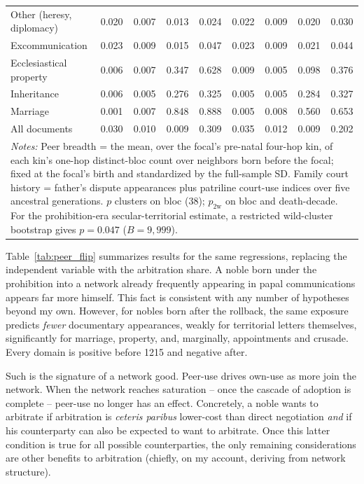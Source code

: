 \documentclass[12pt]{article}
\theoremstyle{definition}
\theoremstyle{remark}
\begin{document}
\begin{table}[!t]
{\begin{tabular}{lcccccccc}
Other (heresy, diplomacy) & 0.020 & 0.007 & 0.013 & 0.024 & 0.022 & 0.009 & 0.020 & 0.030 \\
Excommunication & 0.023 & 0.009 & 0.015 & 0.047 & 0.023 & 0.009 & 0.021 & 0.044 \\
Ecclesiastical property & 0.006 & 0.007 & 0.347 & 0.628 & 0.009 & 0.005 & 0.098 & 0.376 \\
Inheritance & 0.006 & 0.005 & 0.276 & 0.325 & 0.005 & 0.005 & 0.284 & 0.327 \\
Marriage & 0.001 & 0.007 & 0.848 & 0.888 & 0.005 & 0.008 & 0.560 & 0.653 \\
All documents & 0.030 & 0.010 & 0.009 & 0.309 & 0.035 & 0.012 & 0.009 & 0.202 \\
\midrule
\multicolumn{9}{p{0.96\textwidth}}{\footnotesize \textit{Notes:} Peer breadth = the mean, over the focal's pre-natal four-hop kin, of each kin's one-hop distinct-bloc count over neighbors born before the focal; fixed at the focal's birth and standardized by the full-sample SD. Family court history = father's dispute appearances plus patriline court-use indices over five ancestral generations. $p$ clusters on bloc (38); $p_{\text{2w}}$ on bloc and death-decade. For the prohibition-era secular-territorial estimate, a restricted wild-cluster bootstrap gives $p=0.047$ ($B=9{,}999$).} \\
\bottomrule
\end{tabular}
}
\end{table}



Table~\ref{tab:peer_flip} summarizes results for the same regressions, replacing the independent variable with the arbitration share. A noble born under the prohibition into a network already frequently appearing in papal communications appears far more himself. This fact is consistent with any number of hypotheses beyond my own. However, for nobles born after the rollback, the same exposure predicts \emph{fewer} documentary appearances, weakly for territorial letters themselves, significantly for marriage, property, and, marginally, appointments and crusade. Every domain is positive before 1215 and negative after.

Such is the signature of a network good. Peer-use drives own-use as more join the network. When the network reaches saturation -- once the cascade of adoption is complete -- peer-use no longer has an effect. Concretely, a noble wants to arbitrate if arbitration is \textit{ceteris paribus} lower-cost than direct negotiation \textit{and} if his counterparty can also be expected to want to arbitrate. Once this latter condition is true for all possible counterparties, the only remaining considerations are other benefits to arbitration (chiefly, on my account, deriving from network structure).
\end{document}
